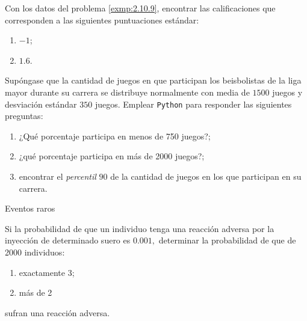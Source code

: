  \begin{ejemplo}
   \label{exmp:2.10.10}
   Con los datos del problema \ref{exmp:2.10.9}, encontrar las calificaciones que corresponden a las siguientes puntuaciones estándar:
  \begin{enumerate}
   \item $-1$;
   \item $1.6$.
  \end{enumerate}

 \end{ejemplo}



 \begin{ejemplo}
  \label{exmp:2.10.11}
  Supóngase que la cantidad de juegos en que participan los beisbolistas de la liga mayor durante su carrera se distribuye normalmente con media de $1500$ juegos y desviación estándar $350$ juegos. Emplear \texttt{Python} para responder las siguientes preguntas:
  \begin{enumerate}
   \item ¿Qué porcentaje participa en menos de 750 juegos?;
   \item ¿qué porcentaje participa en más de 2000 juegos?;
   \item encontrar el \emph{percentil} $90$ de la cantidad de juegos en los que participan en su carrera.
  \end{enumerate}

 \end{ejemplo}





{Eventos raros}
\begin{ejemplo}
\label{exmp:2.10.12}
  Si la probabilidad de que un individuo tenga una reacción adversa por la inyección de determinado suero es $0.001,$ determinar la probabilidad de que de 2000 individuos:
 \begin{enumerate}
  \item exactamente 3;
  \item más de 2
 \end{enumerate}
sufran una reacción adversa.
\end{ejemplo}





